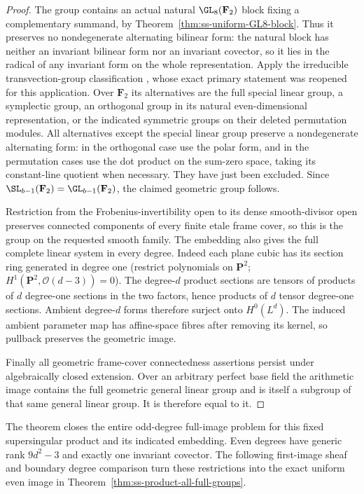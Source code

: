 \begin{proof}
The group contains an actual natural $\GL_8(\mathbf F_2)$ block
fixing a complementary summand, by
Theorem~\ref{thm:ss-uniform-GL8-block}. Thus it preserves no
nondegenerate alternating bilinear form: the natural block has
neither an invariant bilinear form nor an invariant covector,
so it lies in the radical of any invariant form on the whole
representation.
Apply the irreducible transvection-group classification
\cite[Theorem~3.6, printed p.~22]{KantorSeress2001}, whose exact
primary statement was reopened for this application. Over
$\mathbf F_2$ its alternatives are the full special linear
group, a symplectic group, an orthogonal group in its natural
even-dimensional representation, or the indicated symmetric
groups on their deleted permutation modules. All alternatives
except the special linear group preserve a nondegenerate
alternating form: in the orthogonal case use the polar form,
and in the permutation cases use the dot product on the
sum-zero space, taking its constant-line quotient when necessary.
They have just been excluded. Since
$\SL_{b-1}(\mathbf F_2)=\GL_{b-1}(\mathbf F_2)$, the claimed
geometric group follows.

Restriction from the Frobenius-invertibility open to its dense
smooth-divisor open preserves connected components of every finite
etale frame cover, so this is the group on the requested smooth
family. The embedding also gives the full complete linear system
in every degree. Indeed each plane cubic has its section ring
generated in degree one (restrict polynomials on $\mathbf P^2$;
$H^1(\mathbf P^2,\mathcal O(d-3))=0$). The degree-$d$ product
sections are tensors of products of $d$ degree-one sections in
the two factors, hence products of $d$ tensor degree-one sections.
Ambient degree-$d$ forms therefore surject onto $H^0(L^d)$.
The induced ambient parameter map has affine-space fibres after
removing its kernel, so pullback preserves the geometric image.

Finally all geometric frame-cover connectedness assertions persist
under algebraically closed extension. Over an arbitrary perfect
base field the arithmetic image contains the full geometric
general linear group and is itself a subgroup of that same
general linear group. It is therefore equal to it.
\end{proof}

\begin{remark}
The theorem closes the entire odd-degree full-image problem for
this fixed supersingular product and its indicated embedding.
Even degrees have generic rank $9d^2-3$ and exactly one invariant
covector. The following first-image sheaf and boundary degree comparison
turn these restrictions into the exact uniform even image in
Theorem~\ref{thm:ss-product-all-full-groups}.
\end{remark}
